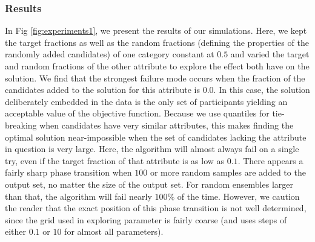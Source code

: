 \documentclass[10pt,letterpaper]{article}
\begin{document}
\subsubsection*{Results}
In Fig \ref{fig:experiments1}, we present the results of our simulations. Here, we kept the target fractions as well as the random fractions (defining the properties of the randomly added candidates) of one category constant at $0.5$ and varied the target and random fractions of the other attribute to explore the effect both have on the solution. We find that the strongest failure mode occurs when the fraction of the candidates added to the solution for this attribute is $0.0$. In this case, the solution deliberately embedded in the data is the only set of participants yielding an acceptable value of the objective function. Because we use quantiles for tie-breaking when candidates have very similar attributes, this makes finding the optimal solution near-impossible when the set of candidates lacking the attribute in question is very large. Here, the algorithm will almost always fail on a single try, even if the target fraction of that attribute is as low as $0.1$. There appears a fairly sharp phase transition when $100$ or more random samples are added to the output set, no matter the size of the output set. For random ensembles larger than that, the algorithm will fail nearly $100\%$ of the time. However, we caution the reader that the exact position of this phase transition is not well determined, since the grid used in exploring parameter is fairly coarse (and uses steps of either $0.1$ or $10$ for almost all parameters). 
\end{document}
